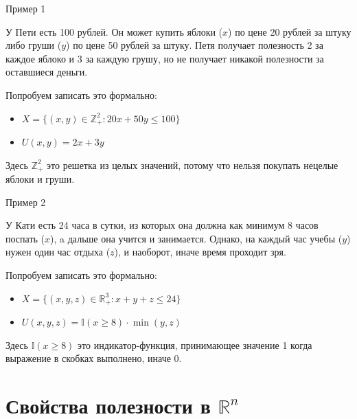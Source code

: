 \documentclass{beamer}
\begin{document}
\begin{frame}{Пример 1}

У Пети есть 100 рублей. Он может купить яблоки ($x$) по цене 20 рублей за штуку либо груши ($y$) по цене 50 рублей за штуку. Петя получает полезность 2 за каждое яблоко и 3 за каждую грушу, но не получает никакой полезности за оставшиеся деньги. 

Попробуем записать это формально:

\begin{itemize}
  \item $X = \{(x, y) \in  \mathbb{Z}^2_{+}: 20 x + 50 y \leqslant 100 \}$
  \item $U(x, y) = 2x + 3y$
\end{itemize}

Здесь $\mathbb{Z}^2_{+}$ это \alert{решетка из целых значений}, потому что нельзя покупать нецелые яблоки и груши.

\end{frame}

\begin{frame}{Пример 2}

У Кати есть 24 часа в сутки, из которых она должна как минимум 8 часов поспать ($x$), a дальше она учится и занимается. Однако, на каждый час учебы ($y$) нужен один час отдыха ($z$), и наоборот, иначе время проходит зря.

Попробуем записать это формально:

\begin{itemize}
  \item $X = \{(x, y, z) \in  \mathbb{R}^3_{+}: x + y + z \leqslant 24 \}$
  \item $U(x, y, z) = \mathbb{I}(x \geqslant 8)\cdot \min(y,z)$
\end{itemize}

Здесь $\mathbb{I}(x \geqslant 8)$ это \alert{индикатор-функция}, принимающее значение 1 когда выражение в скобках выполнено, иначе 0.

\end{frame}

\section{Свойства полезности в $\mathbb{R}^n$}
\end{document}
